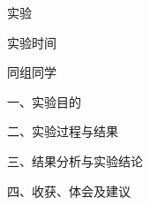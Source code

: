 \documentclass[12pt, a4paper, UTF8, oneside]{ctexart}
\begin{document}
    
    
    
    \maketitle

    \linespread{1.5} \selectfont

    \begin{center}
        \heiti \fontsize{\sanhao}{1em} \selectfont 实验\extimes \qquad \exname
        \vspace{0.3cm}
    \end{center}

    {
    \heiti \fontsize{\sihao}{1em} \selectfont
    \begin{minipage}[b]{0.4\linewidth}
        \begin{center}
            实验时间\underline{\makebox[6em][c]{\extime}}
        \end{center}
    \end{minipage}
    \hfill
    \begin{minipage}[b]{0.4\linewidth}
        \begin{center}
            同组同学\underline{\makebox[6em][c]{\classmate}}
        \end{center}
    \end{minipage}
    }
    \vspace{0.5cm}
    
    \begin{flushleft}
        \heiti\fontsize{\sihao}{1em} \selectfont 一、实验目的
    \end{flushleft}

    
    
    \begin{flushleft}
        \heiti\fontsize{\sihao}{1em} \selectfont 二、实验过程与结果
    \end{flushleft}

    

    \begin{flushleft}
        \heiti\fontsize{\sihao}{1em} \selectfont 三、结果分析与实验结论
    \end{flushleft}
    
    
    
    \begin{flushleft}
        \heiti\fontsize{\sihao}{1em} \selectfont 四、收获、体会及建议
    \end{flushleft}

    
    
\end{document}

